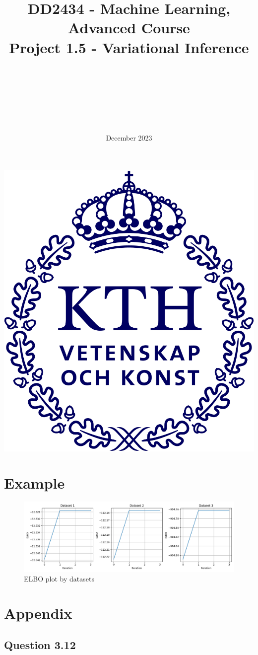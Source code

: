 \documentclass{article}
\title{DD2434 - Machine Learning, Advanced Course \\ Project 1.5 - Variational Inference}
\author{\authorFst \\ \emailFst \and \authorSnd \\ \emailSnd \and \authorTrd \\ \emailTrd \and \authorFrth \\ \emailFrth}
\date{December 2023}
\begin{document}
\maketitle

\begin{center}
    \includegraphics[scale=0.5]{KTH_logo_RGB_bla.png}
\end{center}

\thispagestyle{empty}

\newpage
\tableofcontents
\newpage

\section{Example}

\begin{figure}[H]
    \centering
    \includegraphics[scale=0.5]{images/15_elbo.png}
    \caption{ELBO plot by datasets}
    \label{fig:3.15.2}
\end{figure}

\newpage
\appendix
\section{Appendix}
\subsection{Question 3.12}\label{appendix:code.3.12}

\end{document}
